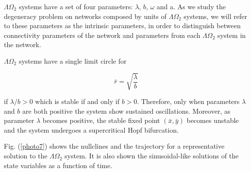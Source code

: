 $\Lambda \Omega_{2}$ systems have a set of four parameters: $\lambda$, $b$, $\omega$ and a. As we study the degeneracy problem on networks composed by units of $\Lambda \Omega_{2}$ systems, we will refer to these parameters as the intrinsic parameters, in order to distinguish between connectivity parameters of the network and parameters from each $\Lambda \Omega_{2}$ system in the network.

$\Lambda \Omega_{2}$ systems have a single limit circle for 

\begin{equation}
    \bar{r} = \sqrt{\frac{\lambda}{b}}
     \label{e9}
\end{equation}

if $\lambda/b>0$ which is stable if and only if $b>0$. Therefore, only when parameters $\lambda$ and $b$ are both positive the system show sustained oscillations. Moreover, as parameter $\lambda$ becomes positive, the stable fixed point $(\bar{x},\bar{y})$ becomes unstable and the system undergoes a supercritical Hopf bifurcation.

Fig. (\ref{photo7}) shows the nullclines and the trajectory for a representative solution to the $\Lambda \Omega_{2}$ system. It is also shown the sinusoidal-like solutions of the state variables as a function of time.

